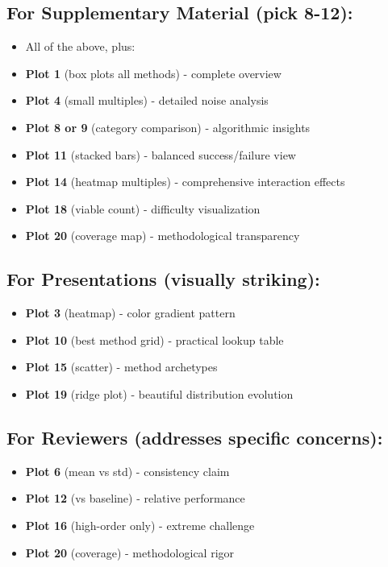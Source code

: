 \documentclass[11pt]{article}
\begin{document}
\subsection*{For Supplementary Material (pick 8-12):}
\begin{itemize}
    \item All of the above, plus:
    \item \textbf{Plot 1} (box plots all methods) - complete overview
    \item \textbf{Plot 4} (small multiples) - detailed noise analysis
    \item \textbf{Plot 8 or 9} (category comparison) - algorithmic insights
    \item \textbf{Plot 11} (stacked bars) - balanced success/failure view
    \item \textbf{Plot 14} (heatmap multiples) - comprehensive interaction effects
    \item \textbf{Plot 18} (viable count) - difficulty visualization
    \item \textbf{Plot 20} (coverage map) - methodological transparency
\end{itemize}

\subsection*{For Presentations (visually striking):}
\begin{itemize}
    \item \textbf{Plot 3} (heatmap) - color gradient pattern
    \item \textbf{Plot 10} (best method grid) - practical lookup table
    \item \textbf{Plot 15} (scatter) - method archetypes
    \item \textbf{Plot 19} (ridge plot) - beautiful distribution evolution
\end{itemize}

\subsection*{For Reviewers (addresses specific concerns):}
\begin{itemize}
    \item \textbf{Plot 6} (mean vs std) - consistency claim
    \item \textbf{Plot 12} (vs baseline) - relative performance
    \item \textbf{Plot 16} (high-order only) - extreme challenge
    \item \textbf{Plot 20} (coverage) - methodological rigor
\end{itemize}
\end{document}
